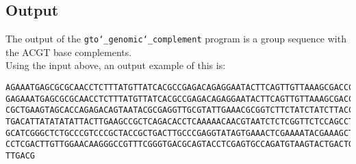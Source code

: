 \subsection*{Output}
The output of the \texttt{gto\char`_genomic\char`_complement} program is a group sequence with the ACGT base complements.\\
Using the input above, an output example of this is:
\begin{lstlisting}
AGAAATGAGCGCGCAACCTCTTTATGTTATCACGCCGAGACAGAGGAATACTTCAGTTGTTAAAGCGACCCTGAACGCC
GAGAAATGAGCGCGCAACCTCTTTATGTTATCACGCCGAGACAGAGGAATACTTCAGTTGTTAAAGCGACCCTGAACGC
CGCTGAAGTAGCACCAGAGACAGTAATACGCGAGGTTGCGTATTGAAACGCGGTCTTCTATCTATCTTACCACATTCTT
TGACATTATATATATTACTTGAAGCCGCTCAGACACCTCAAAAACAACGTAATCTCTCGGTTCTCCAGCCTGCAGGAGT
GCATCGGGCTCTGCCCGTCCCGCTACCGCTGACTTGCCCGAGGTATAGTGAAACTCGAAAATACGAAAGCTGAGGAGGT
CCTCGACTTGTTGGAACAAGGGCCGTTTCGGGTGACGCAGTACCTCGAGTGCCAGATGTAAGTACTGACTGATTGGCAT
TTGACG
\end{lstlisting}